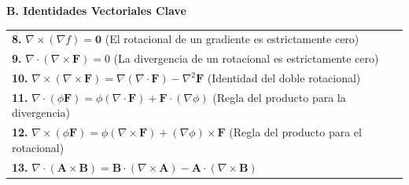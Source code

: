 \documentclass[10pt, landscape, twocolumn]{article}
\begin{document}
\vspace{0.6em}
{\color{themeblue}\normalsize\bfseries B. Identidades Vectoriales Clave} \par
\vspace{-0.2em}
\begin{tabularx}{\linewidth}{|X|}
\hline
\textbf{8.} $\nabla \times (\nabla f) = \mathbf{0}$ (El rotacional de un gradiente es estrictamente cero) \\
\textbf{9.} $\nabla \cdot (\nabla \times \mathbf{F}) = 0$ (La divergencia de un rotacional es estrictamente cero) \\
\textbf{10.} $\nabla \times (\nabla \times \mathbf{F}) = \nabla(\nabla \cdot \mathbf{F}) - \nabla^2\mathbf{F}$ (Identidad del doble rotacional) \\
\textbf{11.} $\nabla \cdot (\phi \mathbf{F}) = \phi(\nabla \cdot \mathbf{F}) + \mathbf{F} \cdot (\nabla \phi)$ (Regla del producto para la divergencia) \\
\textbf{12.} $\nabla \times (\phi \mathbf{F}) = \phi(\nabla \times \mathbf{F}) + (\nabla \phi) \times \mathbf{F}$ (Regla del producto para el rotacional) \\
\textbf{13.} $\nabla \cdot (\mathbf{A} \times \mathbf{B}) = \mathbf{B} \cdot (\nabla \times \mathbf{A}) - \mathbf{A} \cdot (\nabla \times \mathbf{B})$ \\
\hline
\end{tabularx}
\end{document}
